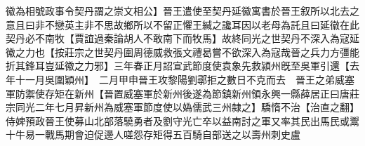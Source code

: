 徽為相號政事令契丹謂之崇文相公】晉王遣使至契丹延徽寓書於晉王叙所以北去之意且曰非不戀英主非不思故鄉所以不留正懼王緘之讒耳因以老母為託且曰延徽在此契丹必不南牧【賈誼過秦論胡人不敢南下而牧馬】故終同光之世契丹不深入為寇延徽之力也【按莊宗之世契丹圍周德威救張文禮曷嘗不欲深入為寇哉晉之兵力方彊能折其鋒耳豈延徽之力邪】三年春正月詔宣武節度使袁象先救潁州旣至吳軍引還【去年十一月吳圍穎州】　二月甲申晉王攻黎陽劉鄩拒之數日不克而去　晉王之弟威塞軍防禦使存矩在新州【晉置威塞軍於新州後遂為節鎮新州領永興一縣薛居正曰唐莊宗同光二年七月昇新州為威塞軍節度使以媯儒武三州隸之】驕惰不治【治直之翻】侍婢預政晉王使募山北部落驍勇者及劉守光亡卒以益南討之軍又率其民出馬民或鬻十牛易一戰馬期會迫促邊人嗟怨存矩得五百騎自部送之以壽州刺史盧